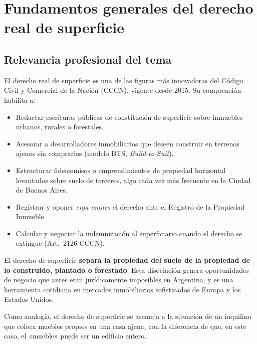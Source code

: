 \documentclass[12pt,oneside]{book}
\begin{document}
\tableofcontents


\chapter[Fundamentos generales]{Fundamentos generales del derecho real de superficie}

\section{Relevancia profesional del tema}

El derecho real de superficie es una de las figuras más innovadoras del Código Civil y Comercial de la Nación (CCCN), vigente desde 2015. Su comprensión habilita a:

\begin{itemize}
    \item Redactar escrituras públicas de constitución de superficie sobre inmuebles urbanos, rurales o forestales.
    \item Asesorar a desarrolladores inmobiliarios que deseen construir en terrenos ajenos sin comprarlos (modelo BTS, \textit{Build-to-Suit}).
    \item Estructurar fideicomisos o emprendimientos de propiedad horizontal levantados sobre suelo de terceros, algo cada vez más frecuente en la Ciudad de Buenos Aires.
    \item Registrar y oponer \textit{erga omnes} el derecho ante el Registro de la Propiedad Inmueble.
    \item Calcular y negociar la indemnización al superficiario cuando el derecho se extingue (Art.~2126 CCCN).
\end{itemize}

\begin{important}
El derecho de superficie \textbf{separa la propiedad del suelo de la propiedad de lo construido, plantado o forestado}. Esta disociación genera oportunidades de negocio que antes eran jurídicamente imposibles en Argentina, y es una herramienta cotidiana en mercados inmobiliarios sofisticados de Europa y los Estados Unidos.
\end{important}

\begin{note}
Como analogía, el derecho de superficie se asemeja a la situación de un inquilino que coloca muebles propios en una casa ajena, con la diferencia de que, en este caso, el «mueble» puede ser un edificio entero.
\end{note}
\end{document}
